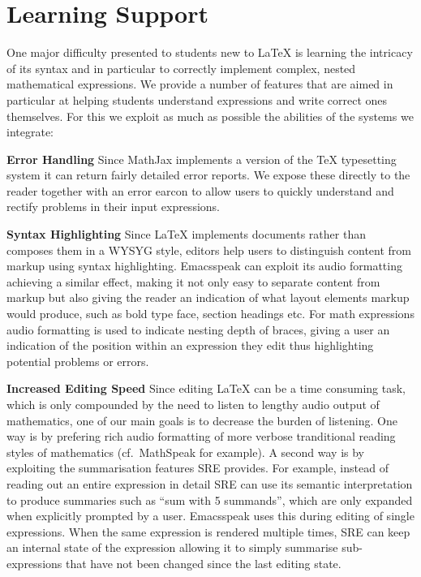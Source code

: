 \documentclass{sig-alternate}
\newcommand{\sre}{SRE\xspace}
\begin{document}
\section{Learning Support}
\label{sec:learning-features}

One major difficulty presented to students new to {\LaTeX} is learning the
intricacy of its syntax and in particular to correctly implement complex, nested
mathematical expressions.  We provide a number of features that are aimed in
particular at helping students understand expressions and write correct ones
themselves. For this we exploit as much as possible the abilities of the systems
we integrate:

\textbf{Error Handling} Since MathJax implements a version of the TeX
typesetting system it can return fairly detailed error reports. We expose these
directly to the reader together with an error earcon to allow users to quickly
understand and rectify problems in their input expressions.

\textbf{Syntax Highlighting} Since {\LaTeX} implements documents rather than
composes them in a WYSYG style, editors help users to distinguish content from
markup using syntax highlighting. Emacsspeak can exploit its audio formatting
achieving a similar effect, making it not only easy to separate content from
markup but also giving the reader an indication of what layout elements markup
would produce, such as bold type face, section headings etc. For math
expressions audio formatting is used to indicate nesting depth of braces, giving
a user an indication of the position within an expression they edit thus
highlighting potential problems or errors.


\textbf{Increased Editing Speed} Since editing {\LaTeX} can be a time consuming
task, which is only compounded by the need to listen to lengthy audio output of
mathematics, one of our main goals is to decrease the burden of listening.  One
way is by prefering rich audio formatting of more verbose tranditional reading
styles of mathematics (cf.~MathSpeak for example). A second way is by exploiting
the summarisation features \sre provides. For example, instead of reading out an
entire expression in detail \sre can use its semantic interpretation to produce
summaries such as ``sum with 5 summands'', which are only expanded when
explicitly prompted by a user. Emacsspeak uses this during editing of single
expressions. When the same expression is rendered multiple times, \sre can keep
an internal state of the expression allowing it to simply summarise
sub-expressions that have not been changed since the last editing state.




\end{document}
